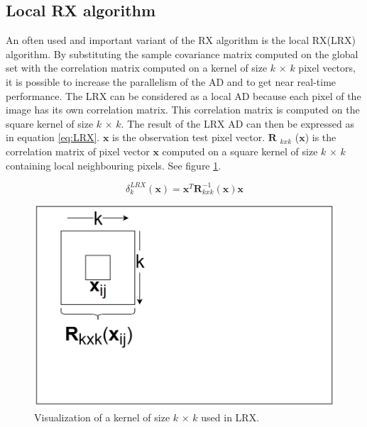 \subsection{Local RX algorithm}
\label{sec:LRX_theory}
An often used and important variant of the RX algorithm is the local RX(LRX) algorithm. By substituting the sample covariance matrix computed on the global set with the correlation matrix computed on a kernel of size $k$ $\times$ $k$ pixel vectors, it is possible to increase the parallelism of the AD and to get near real-time performance. The LRX can be considered as a local AD because each pixel of the image has its own correlation matrix. This correlation matrix is computed on the square kernel of size $k$ $\times$ $k$. The result of the LRX AD can then be expressed as in equation \ref{eq:LRX}. $\textbf{x}$ is the observation test pixel vector. $\textbf{R}$ $_{k x k}$ ($\textbf{x}$) is the correlation matrix of pixel vector $\textbf{x}$ computed on a square kernel of size $k$ $\times$ $k$ containing local neighbouring pixels. See figure \ref{fig:LRX}. 

\begin{equation}
    \delta_k^{LRX}(\textbf{x}) = \textbf{x}^T\textbf{R}^{-1}_{k x k}(\textbf{x})\textbf{x}
    \label{eq:LRX}
\end{equation}


\begin{figure}[H]
\centering
   \includegraphics[scale=0.45]{images/LRX.PNG}
  \caption{ Visualization of a kernel of size $k$ $\times$ $k$ used in LRX. } 
  \label{fig:LRX}
\end{figure}


